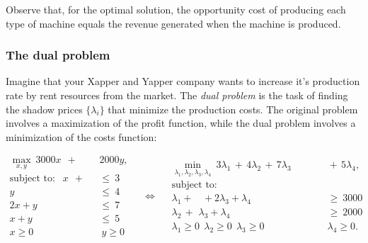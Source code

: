 \documentclass[11pt,oneside]{article}
\begin{document}
			Observe that, for the optimal solution, 
			the opportunity cost of producing each type of machine equals the revenue generated when the machine is produced.

			


			

		\subsubsection{The dual problem}			

			Imagine that your Xapper and Yapper company wants to increase it's production rate by rent resources from the market.
			The \emph{dual problem} is the task of finding the shadow prices $\{\lambda_i\}$ that minimize the production costs.
			The original problem involves a maximization of the profit function,
			while the dual problem involves a minimization of the costs function:
			
			{\footnotesize 
	 		\[
	 			\begin{array}{rl}
				\max_{x,y}  \  3000x  \ \ + & \!\!\!\!2000y,   \\[1mm]
				\textrm{subject to:  } \ \
						x  \ \ +   \ \ 		\ &\leq \		3	\\
							y	\ &\leq \	 	4	\\
						2x	+ y	\ &\leq \	 	7	\\
						x 	+ y	\ &\leq \	 	5	\\
						x \geq 0 \!\!\!& \ y \geq 0
	 			\end{array}
			\quad
	 		\Leftrightarrow
			\quad
	 			\begin{array}{rl}
				{\displaystyle \min_{\lambda_1,\lambda_2,\lambda_3,\lambda_4}} \  3\lambda_1 \, + \,  4\lambda_2 \, + \,  7\lambda_3 \! & \!\!\! + \,  5\lambda_4, \\[3mm]
				\textrm{subject to:  }   \qquad \qquad \qquad \qquad \qquad   \\
						\lambda_1 + \ \ \  \ + 2\lambda_3 + \lambda_4   		\ &\geq \		3000	\\
						          \lambda_2 \, + \,\, \lambda_3 + \lambda_4   		\ &\geq \		2000	\\
						\lambda_1 \geq 0 \ \  \lambda_2 \geq 0 \ \  \lambda_3 \geq 0  & \!\! \lambda_4 \geq 0.
	 			\end{array}
	 		\]}%
	
\end{document}
